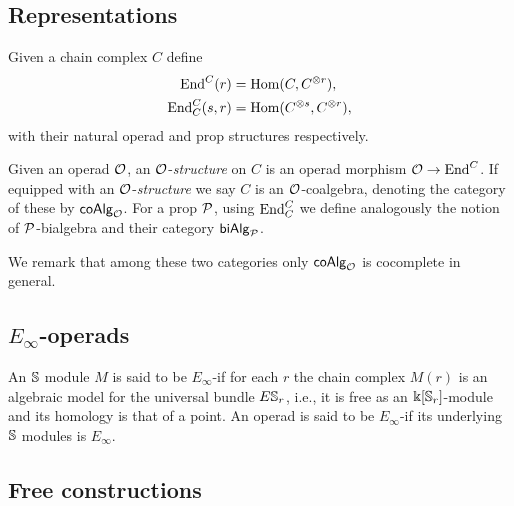 \subsection{Representations}

Given a chain complex $C$ define
\begin{align*}
\End^C(r) &= \Hom(C, C^{\otimes r}), \\
\End^C_C(s, r) &= \Hom(C^{\otimes s}, C^{\otimes r}),
\end{align*}
with their natural operad and prop structures respectively.

Given an operad $\O$, an $\O$-\textit{structure} on $C$ is an operad morphism $\O \to \End^C$.
If equipped with an \mbox{$\O$-\textit{structure}} we say $C$ is an $\O$-coalgebra, denoting the category of these by $\coAlg_\O$.
For a prop $\P$, using $\End_C^C$ we define analogously the notion of $\P$-bialgebra and their category $\biAlg_\P$.

We remark that among these two categories only $\coAlg_\O$ is cocomplete in general.

\subsection{$E_{\infty}$-operads}

An $\S$ module $M$ is said to be $E_{\infty}$-if for each $r$ the chain complex $M(r)$ is an algebraic model for the universal bundle $E\S_r$, i.e., it is free as an $\k[\S_r]$-module and its homology is that of a point.
An operad is said to be $E_{\infty}$-if its underlying $\S$ modules is $E_\infty$.

\subsection{Free constructions} \label{ss:free constructions}

